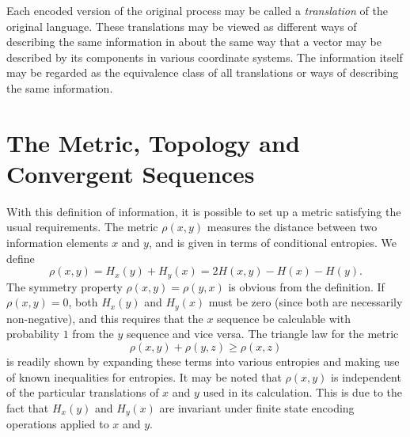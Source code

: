 \documentclass{article}[10pt, letter]
\begin{document}
Each encoded version of the original process may be called a \textit{translation} of the original language. These translations may be viewed as different ways of describing the same information in about the same way that a vector may be described by its components in various coordinate systems. The information itself may be regarded as the equivalence class of all translations or ways of describing the same information.

\section{The Metric, Topology and Convergent Sequences}

With this definition of information, it is possible to set up a metric satisfying the usual requirements. The metric $\rho(x,y)$ measures the distance between two information elements $x$ and $y$, and is given in terms of conditional entropies.
We define
\[
\rho(x, y) = H_x(y) + H_y(x) = 2 H(x,y) - H(x) - H(y).
\]
The symmetry property $\rho(x,y) = \rho(y,x)$ is obvious from the definition. If $\rho(x,y) = 0$, both $H_x(y)$ and $H_y(x)$ must be zero (since both are necessarily non-negative), and this requires that the $x$ sequence be calculable with probability $1$ from the $y$ sequence and vice versa. The triangle law for the metric
\[
\rho(x,y)  + \rho(y,z) \geq \rho(x,z)
\]
is readily shown by expanding these terms into various entropies and making use of known inequalities for entropies. It may be noted that $\rho(x,y)$ is independent of the particular translations of $x$ and $y$ used in its calculation. This is due to the fact that $H_x(y)$ and $H_y(x)$ are invariant under finite state encoding operations applied to $x$ and $y$.
\end{document}
